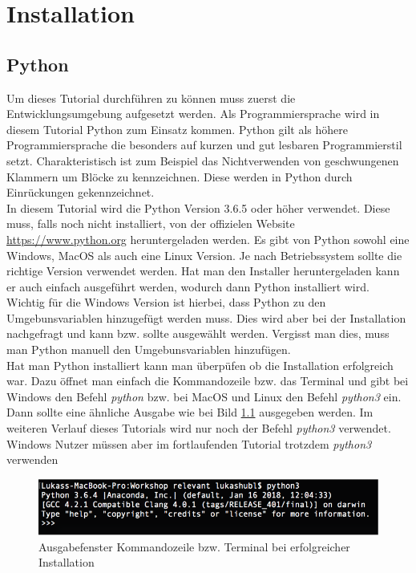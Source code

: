 \chapter{Installation}
\section{Python}
Um dieses Tutorial durchführen zu können muss zuerst die Entwicklungsumgebung aufgesetzt werden. Als Programmiersprache wird in diesem Tutorial Python zum Einsatz kommen. Python gilt als höhere Programmiersprache die besonders auf kurzen und  gut lesbaren Programmierstil setzt. Charakteristisch ist zum Beispiel das Nichtverwenden von geschwungenen Klammern um Blöcke zu kennzeichnen. Diese werden in Python durch Einrückungen gekennzeichnet.\\
In diesem Tutorial wird die Python Version 3.6.5 oder höher verwendet. Diese muss, falls noch nicht installiert, von der offizielen Website \href{https://www.python.org}{https://www.python.org} heruntergeladen werden. Es gibt von Python sowohl eine Windows, MacOS als auch eine Linux Version. Je nach Betriebssystem sollte die richtige Version verwendet werden. Hat man den Installer heruntergeladen kann er auch einfach ausgeführt werden, wodurch dann Python installiert wird. Wichtig für die Windows Version ist hierbei, dass Python zu den Umgebunsvariablen hinzugefügt werden muss. Dies wird aber bei der Installation nachgefragt und kann bzw. sollte ausgewählt werden. Vergisst man dies, muss man Python manuell den Umgebunsvariablen hinzufügen.\\
Hat man Python installiert kann man überpüfen ob die Installation erfolgreich war. Dazu öffnet man einfach die Kommandozeile bzw. das Terminal und gibt bei Windows den Befehl \emph{python} bzw. bei MacOS und Linux den Befehl \emph{python3} ein. Dann sollte eine ähnliche Ausgabe wie bei Bild \ref{fig:cmd} ausgegeben werden. Im weiteren Verlauf dieses Tutorials wird nur noch der Befehl \emph{python3} verwendet. Windows Nutzer müssen aber im fortlaufenden Tutorial trotzdem \emph{python3} verwenden
\begin{figure}[!ht]
\centering
\includegraphics[width=1.00\textwidth]{images/cmd}
\caption{Ausgabefenster Kommandozeile bzw. Terminal bei erfolgreicher Installation}
\label{fig:cmd}
\end{figure}
